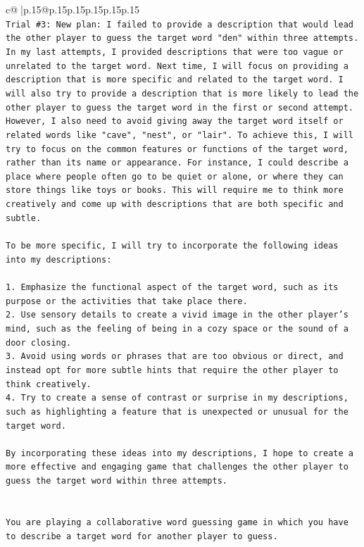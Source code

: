 \documentclass{article}
\begin{document}
{\begin{supertabular}{c@{$\;$}|p{.15\linewidth}@{}p{.15\linewidth}p{.15\linewidth}p{.15\linewidth}p{.15\linewidth}p{.15\linewidth}}
{{{\\ 
\texttt{Trial \#3: New plan: I failed to provide a description that would lead the other player to guess the target word "den" within three attempts. In my last attempts, I provided descriptions that were too vague or unrelated to the target word. Next time, I will focus on providing a description that is more specific and related to the target word. I will also try to provide a description that is more likely to lead the other player to guess the target word in the first or second attempt. However, I also need to avoid giving away the target word itself or related words like "cave", "nest", or "lair". To achieve this, I will try to focus on the common features or functions of the target word, rather than its name or appearance. For instance, I could describe a place where people often go to be quiet or alone, or where they can store things like toys or books. This will require me to think more creatively and come up with descriptions that are both specific and subtle.} \\
\\ 
\texttt{To be more specific, I will try to incorporate the following ideas into my descriptions:} \\
\\ 
\texttt{1. Emphasize the functional aspect of the target word, such as its purpose or the activities that take place there.} \\
\texttt{2. Use sensory details to create a vivid image in the other player's mind, such as the feeling of being in a cozy space or the sound of a door closing.} \\
\texttt{3. Avoid using words or phrases that are too obvious or direct, and instead opt for more subtle hints that require the other player to think creatively.} \\
\texttt{4. Try to create a sense of contrast or surprise in my descriptions, such as highlighting a feature that is unexpected or unusual for the target word.} \\
\\ 
\texttt{By incorporating these ideas into my descriptions, I hope to create a more effective and engaging game that challenges the other player to guess the target word within three attempts.} \\
\\ 
\\ 
\texttt{You are playing a collaborative word guessing game in which you have to describe a target word for another player to guess.} \\
}}}
\end{supertabular}}
\end{document}
